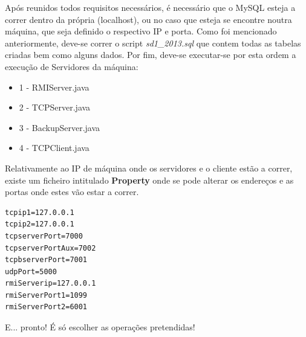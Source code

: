 \documentclass[12pt]{article} %
\begin{document}
Após reunidos todos requisitos necessários, é necessário que o MySQL esteja a correr dentro da própria (localhost), ou no caso que esteja se encontre noutra máquina, que seja definido o respectivo IP e porta.
Como foi mencionado anteriormente, deve-se correr o script \emph{sd1\_2013.sql} que contem todas as tabelas criadas bem como alguns dados.
Por fim, deve-se executar-se por esta ordem a execução de Servidores da máquina:

\begin{itemize}
	\item 1 - RMIServer.java
 	\item 2 - TCPServer.java
	\item 3 - BackupServer.java
	\item 4 - TCPClient.java
\end{itemize}
Relativamente ao IP de máquina onde os servidores e o cliente estão a correr, existe um ficheiro intitulado \textbf{Property} onde se pode alterar os endereços e as portas onde estes vão estar a correr.

\begin{verbatim}
tcpip1=127.0.0.1
tcpip2=127.0.0.1
tcpserverPort=7000
tcpserverPortAux=7002
tcpbserverPort=7001
udpPort=5000
rmiServerip=127.0.0.1
rmiServerPort1=1099
rmiServerPort2=6001
\end{verbatim}


E... pronto! É só escolher as operações pretendidas!
\end{document}
